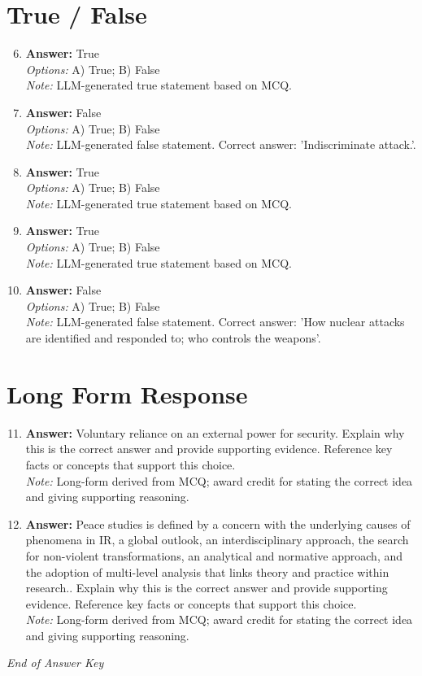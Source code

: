\documentclass[12pt]{article}
\begin{document}
\section*{True / False}
\begin{enumerate}[label=\arabic*.]
\setcounter{enumi}{5}
\item \textbf{Answer:} True
\\ \textit{Options:} A) True; B) False
\\ \textit{Note:} LLM-generated true statement based on MCQ.
\item \textbf{Answer:} False
\\ \textit{Options:} A) True; B) False
\\ \textit{Note:} LLM-generated false statement. Correct answer: 'Indiscriminate attack.'.
\item \textbf{Answer:} True
\\ \textit{Options:} A) True; B) False
\\ \textit{Note:} LLM-generated true statement based on MCQ.
\item \textbf{Answer:} True
\\ \textit{Options:} A) True; B) False
\\ \textit{Note:} LLM-generated true statement based on MCQ.
\item \textbf{Answer:} False
\\ \textit{Options:} A) True; B) False
\\ \textit{Note:} LLM-generated false statement. Correct answer: 'How nuclear attacks are identified and responded to; who controls the weapons'.
\end{enumerate}

\section*{Long Form Response}
\begin{enumerate}[label=\arabic*.]
\setcounter{enumi}{10}
\item \textbf{Answer:} Voluntary reliance on an external power for security. Explain why this is the correct answer and provide supporting evidence. Reference key facts or concepts that support this choice.
\\ \textit{Note:} Long-form derived from MCQ; award credit for stating the correct idea and giving supporting reasoning.
\item \textbf{Answer:} Peace studies is defined by a concern with the underlying causes of phenomena in IR, a global outlook, an interdisciplinary approach, the search for non-violent transformations, an analytical and normative approach, and the adoption of multi-level analysis that links theory and practice within research.. Explain why this is the correct answer and provide supporting evidence. Reference key facts or concepts that support this choice.
\\ \textit{Note:} Long-form derived from MCQ; award credit for stating the correct idea and giving supporting reasoning.
\end{enumerate}

\vfill
\noindent\textit{End of Answer Key}
\end{document}
